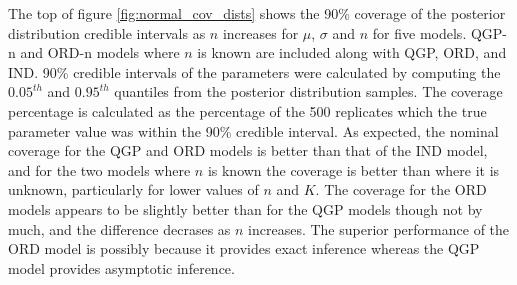 \documentclass[preprint,12pt,authoryear]{elsarticle}
\newcommand{\1}[1]{\mathds{1}\left[#1\right]}
\begin{document}
% 


The top of figure \ref{fig:normal_cov_dists} shows the 90\% coverage of 
the posterior distribution credible intervals as $n$ increases for 
$\mu$, $\sigma$ and $n$ for five models. QGP-n and ORD-n models where $n$ is 
known are included along with QGP, ORD, and IND. 90\% credible intervals of the 
parameters were calculated by computing the $0.05^{th}$ and $0.95^{th}$ 
quantiles from the posterior distribution samples. The coverage percentage is 
calculated as the percentage of the 500 replicates which the true parameter 
value was within the 90\% credible interval.
As expected, the nominal coverage for the QGP and ORD models is better than 
that of the IND model, and for the two models where $n$ is known the coverage 
is better than where it is unknown, particularly for lower values of 
$n$ and $K$. The coverage for the ORD models appears to be slightly better 
than for the QGP models though not by much, and the difference
decrases as $n$ increases. 
The superior performance of the ORD model is possibly because it
provides exact inference 
whereas the QGP model provides asymptotic inference.
\end{document}
